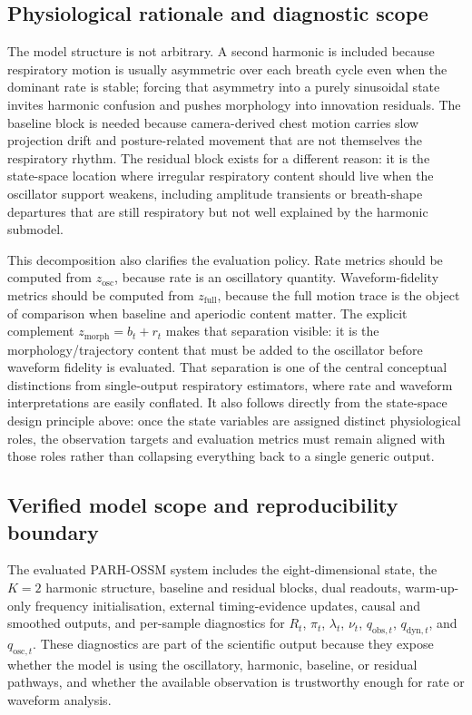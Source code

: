 \documentclass[fleqn,10pt]{wlscirep}
\begin{document}
\subsection*{Physiological rationale and diagnostic scope}
The model structure is not arbitrary. A second harmonic is included because
respiratory motion is usually asymmetric over each breath cycle even when the
dominant rate is stable; forcing that asymmetry into a purely sinusoidal state
invites harmonic confusion and pushes morphology into innovation residuals.
The baseline block is needed because camera-derived chest motion carries slow
projection drift and posture-related movement that are not themselves the
respiratory rhythm. The residual block exists for a different reason: it is the
state-space location where irregular respiratory content should live when the
oscillator support weakens, including amplitude transients or breath-shape
departures that are still respiratory but not well explained by the harmonic
submodel.

This decomposition also clarifies the evaluation policy. Rate metrics should be
computed from $z_{\mathrm{osc}}$, because rate is an oscillatory quantity.
Waveform-fidelity metrics should be computed from $z_{\mathrm{full}}$, because
the full motion trace is the object of comparison when baseline and aperiodic
content matter. The explicit complement $z_{\mathrm{morph}}=b_t+r_t$ makes that
separation visible: it is the morphology/trajectory content that must be added
to the oscillator before waveform fidelity is evaluated. That separation is one
of the central conceptual
distinctions from single-output respiratory estimators, where rate and waveform
interpretations are easily conflated. It also follows directly from the
state-space design principle above: once the state variables are assigned
distinct physiological roles, the observation targets and evaluation metrics
must remain aligned with those roles rather than collapsing everything back to
a single generic output.

\subsection*{Verified model scope and reproducibility boundary}
The evaluated PARH-OSSM system includes the eight-dimensional state, the
$K=2$ harmonic structure, baseline and residual blocks, dual readouts,
warm-up-only frequency initialisation, external timing-evidence updates,
causal and smoothed outputs, and per-sample diagnostics for $R_t$, $\pi_t$,
$\lambda_t$, $\nu_t$, $q_{\mathrm{obs},t}$,
$q_{\mathrm{dyn},t}$, and $q_{\mathrm{osc},t}$. These diagnostics are part of
the scientific output because they expose whether the model is using the
oscillatory, harmonic, baseline, or residual pathways, and whether the
available observation is trustworthy enough for rate or waveform analysis.
\end{document}
